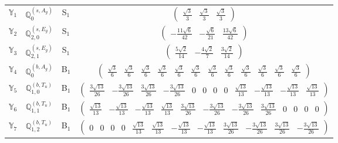 \documentclass[fleqn,10pt,landscape]{article}
\begin{document}
\begin{itemize}
\begin{center}
\begin{longtable}{c|c|c|c}
$ \mathbb{Y}_{1} $ & $\mathbb{Q}_{0}^{(s,A_{g})}$ & S$_{1}$ & $\begin{pmatrix} \frac{\sqrt{3}}{3} & \frac{\sqrt{3}}{3} & \frac{\sqrt{3}}{3} \end{pmatrix}$ \\
$ \mathbb{Y}_{2} $ & $\mathbb{Q}_{2,0}^{(s,E_{g})}$ & S$_{1}$ & $\begin{pmatrix} - \frac{11 \sqrt{6}}{42} & - \frac{\sqrt{6}}{21} & \frac{13 \sqrt{6}}{42} \end{pmatrix}$ \\
$ \mathbb{Y}_{3} $ & $\mathbb{Q}_{2,1}^{(s,E_{g})}$ & S$_{1}$ & $\begin{pmatrix} \frac{5 \sqrt{2}}{14} & - \frac{4 \sqrt{2}}{7} & \frac{3 \sqrt{2}}{14} \end{pmatrix}$ \\ \hline
$ \mathbb{Y}_{4} $ & $\mathbb{Q}_{0}^{(b,A_{g})}$ & B$_{1}$ & $\begin{pmatrix} \frac{\sqrt{3}}{6} & \frac{\sqrt{3}}{6} & \frac{\sqrt{3}}{6} & \frac{\sqrt{3}}{6} & \frac{\sqrt{3}}{6} & \frac{\sqrt{3}}{6} & \frac{\sqrt{3}}{6} & \frac{\sqrt{3}}{6} & \frac{\sqrt{3}}{6} & \frac{\sqrt{3}}{6} & \frac{\sqrt{3}}{6} & \frac{\sqrt{3}}{6} \end{pmatrix}$ \\
$ \mathbb{Y}_{5} $ & $\mathbb{Q}_{1,0}^{(b,T_{u})}$ & B$_{1}$ & $\begin{pmatrix} \frac{3 \sqrt{13}}{26} & - \frac{3 \sqrt{13}}{26} & \frac{3 \sqrt{13}}{26} & - \frac{3 \sqrt{13}}{26} & 0 & 0 & 0 & 0 & \frac{\sqrt{13}}{13} & - \frac{\sqrt{13}}{13} & - \frac{\sqrt{13}}{13} & \frac{\sqrt{13}}{13} \end{pmatrix}$ \\
$ \mathbb{Y}_{6} $ & $\mathbb{Q}_{1,1}^{(b,T_{u})}$ & B$_{1}$ & $\begin{pmatrix} \frac{\sqrt{13}}{13} & - \frac{\sqrt{13}}{13} & - \frac{\sqrt{13}}{13} & \frac{\sqrt{13}}{13} & \frac{3 \sqrt{13}}{26} & - \frac{3 \sqrt{13}}{26} & - \frac{3 \sqrt{13}}{26} & \frac{3 \sqrt{13}}{26} & 0 & 0 & 0 & 0 \end{pmatrix}$ \\
$ \mathbb{Y}_{7} $ & $\mathbb{Q}_{1,2}^{(b,T_{u})}$ & B$_{1}$ & $\begin{pmatrix} 0 & 0 & 0 & 0 & \frac{\sqrt{13}}{13} & \frac{\sqrt{13}}{13} & - \frac{\sqrt{13}}{13} & - \frac{\sqrt{13}}{13} & \frac{3 \sqrt{13}}{26} & - \frac{3 \sqrt{13}}{26} & \frac{3 \sqrt{13}}{26} & - \frac{3 \sqrt{13}}{26} \end{pmatrix}$ \\

\end{longtable}
\end{center}
\end{itemize}
\end{document}
